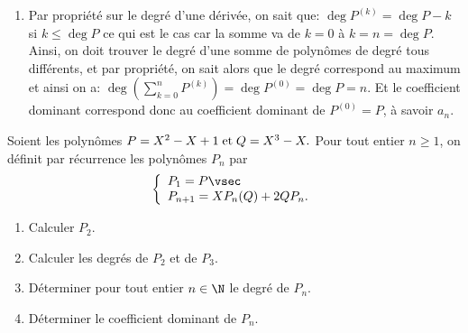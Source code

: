 \documentclass[a4paper, 11pt,reqno]{article}
\begin{document}
\begin{correction}
\begin{enumerate}
		\item Par propri\'et\'e sur le degr\'e d'une d\'eriv\'ee, on sait que: $\deg{ P^{(k)}}=\deg{P}-k$ si $k\leq \deg{P}$ ce qui est le cas car la somme va de $k=0$ \`{a} $k=n=\deg{P}$. Ainsi, on doit trouver le degr\'e d'une somme de polyn\^{o}mes de degr\'e tous diff\'erents, et par propri\'et\'e, on sait alors que le degr\'e correspond au maximum et ainsi on a: $\deg{\left( \sum\limits_{k=0}^n P^{(k)}\right)}=\deg{P^{(0)}}=\deg{P}=n$. Et le coefficient dominant correspond donc au coefficient dominant de $P^{(0)}=P$, \`{a} savoir $a_n$.
	\end{enumerate}
\end{correction}







\begin{exercice}  \;
	Soient les polyn\^omes $P=X^2-X+1\; \hbox{et}\; Q=X^3-X.$
	Pour tout entier $n\geq 1$, on d\'efinit par r\'ecurrence les polyn\^omes $P_n$ par
	$$\left\lbrace\begin{array}{l}
			P_1=P\vsec \\
			P_{n+1}=XP_n(Q)+2QP_n.
		\end{array}\right.$$
	\begin{enumerate}
		\item Calculer $P_2$.
		\item Calculer les degr\'es de $P_2$ et de $P_3$.
		\item D\'eterminer pour tout entier $n\in\N$ le degr\'e de $P_n$.
		\item D\'eterminer le coefficient dominant de $P_n$.
	\end{enumerate}
\end{exercice}
\end{document}
